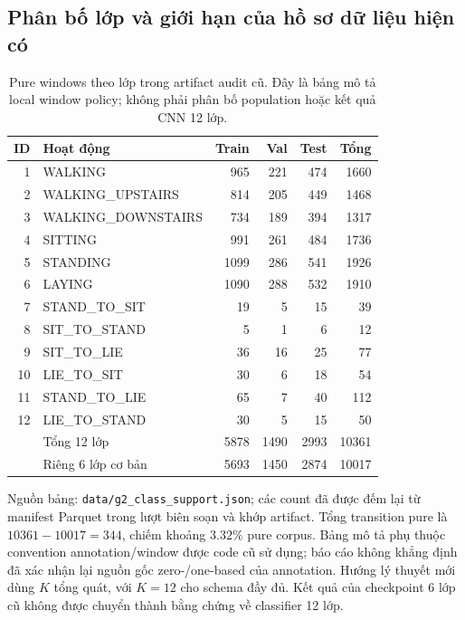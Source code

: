 \documentclass[11pt,a4paper]{article}
\newcommand{\code}[1]{{\small\ttfamily\nolinkurl{#1}}}
\theoremstyle{remark}
\begin{document}
\subsection{Phân bố lớp và giới hạn của hồ sơ dữ liệu hiện có}
\begin{table}[!htbp]\centering\small
\caption{Pure windows theo lớp trong artifact audit cũ. Đây là bảng mô tả
local window policy; không phải phân bố population hoặc kết quả CNN 12 lớp.}
\label{tab:classes}
\begin{tabularx}{\linewidth}{@{}rYrrrr@{}}\toprule
ID & Hoạt động & Train & Val & Test & Tổng\\ & WALKING &965&221&474&1660\\
2 & WALKING\_UPSTAIRS &814&205&449&1468\\
3 & WALKING\_DOWNSTAIRS &734&189&394&1317\\
4 & SITTING &991&261&484&1736\\
5 & STANDING &1099&286&541&1926\\
6 & LAYING &1090&288&532&1910\\
7 & STAND\_TO\_SIT &19&5&15&39\\
8 & SIT\_TO\_STAND &5&1&6&12\\
9 & SIT\_TO\_LIE &36&16&25&77\\
10 & LIE\_TO\_SIT &30&6&18&54\\
11 & STAND\_TO\_LIE &65&7&40&112\\
12 & LIE\_TO\_STAND &30&5&15&50\\\midrule
 & Tổng 12 lớp &5878&1490&2993&10361\\
 & Riêng 6 lớp cơ bản &5693&1450&2874&10017\\\bottomrule
\end{tabularx}
\end{table}
Nguồn bảng: \code{data/g2_class_support.json}; các count đã được đếm lại
từ manifest Parquet trong lượt biên soạn và khớp artifact. Tổng transition pure là
$10361-10017=344$, chiếm khoảng $3.32\%$ pure corpus. Bảng mô tả phụ thuộc
convention annotation/window được code cũ sử dụng; báo cáo không khẳng định
đã xác nhận lại nguồn gốc zero-/one-based của annotation. Hướng lý thuyết
mới dùng $K$ tổng quát, với $K=12$ cho schema đầy đủ. Kết quả của checkpoint
6 lớp cũ không được chuyển thành bằng chứng về classifier 12 lớp.
\end{document}

